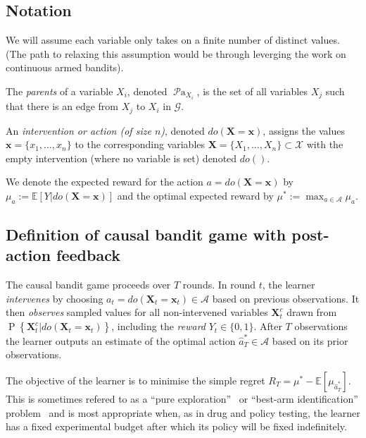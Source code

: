 \documentclass[11pt,a4paper,oneside]{book}
\newcommand{\simpleregret}{R_T}
\newcommand{\actions}{\mathcal{A}}
\newcommand{\E}[1]{\mathbb E\left[{#1}\right]}
\renewcommand{\P}[1]{\operatorname{P}\left\{#1\right\}}
\newcommand{\parents}[1]{\operatorname{\mathcal{P}a}_{#1}}
\renewcommand{\vec}[1]{\boldsymbol{#1}}
\begin{document}
\subsection*{Notation}

We will assume each variable only takes on a finite number of distinct values. (The path to relaxing this assumption would be through leverging the work on continuous armed bandits). 

The \emph{parents} of a variable $X_i$, denoted $\parents{X_i}$, is the set of all variables $X_j$ such that there is an edge from $X_j$ to $X_i$ in $\mathcal{G}$.

An \emph{intervention or action (of size $n$)}, denoted $do(\vec{X}=\vec{x})$, assigns the values $\vec{x}=\{x_1, \ldots, x_n\}$ to the corresponding variables $\vec{X}=\{X_1, \ldots, X_n\} \subset \mathcal{X}$ with the empty intervention (where no variable is set) denoted $do()$.


We denote the expected reward for the action $a = do(\vec{X} = \vec{x})$ by $\mu_{a} := \E{Y | do(\vec{X} = \vec{x})}$ and 
the optimal expected reward by $\mu^* := \max_{a\in\actions} \mu_{a}$. 


\subsection*{Definition of causal bandit game with post-action feedback}

The causal bandit game proceeds over $T$ rounds.
In round $t$, the learner \emph{intervenes} by choosing $a_t = do(\vec{X}_t = \vec{x}_t) \in \mathcal{A}$ based on previous observations. 
It then \emph{observes} sampled values for all non-intervened variables $\vec{X}^c_t$ drawn from $\P{\vec{X}^c_t | do(\vec{X}_t = \vec{x}_t)}$, 
including the \emph{reward} $Y_t \in \{0,1\}$. 
After $T$ observations the learner outputs an estimate of the optimal action $\hat a^*_T \in \actions$ based on its prior observations.

The objective of the learner is to minimise the simple regret $\simpleregret = \mu^* - \E{\mu_{\hat a^*_T}}.$ This is sometimes refered to as a ``pure exploration''~\citep{Bubeck2009a} or ``best-arm identification'' problem~\citep{Gabillon2012a} and is most appropriate when, as in drug and policy testing, the learner has a fixed experimental budget after which its policy will be fixed indefinitely. 
\end{document}
